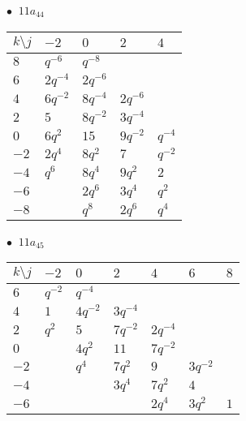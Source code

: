\begin{minipage}{\linewidth}
$\bullet\ $ $11a_{44}$ \vspace{0.5em} \\
\begin{tabular}{l|llll}
$k \setminus j$ & $-2$ & $0$ & $2$ & $4$ \\
\hline
$8$ & $q^{-6}$ & $q^{-8}$ &  &  \\
$6$ & $2q^{-4}$ & $2q^{-6}$ &  &  \\
$4$ & $6q^{-2}$ & $8q^{-4}$ & $2q^{-6}$ &  \\
$2$ & $5$ & $8q^{-2}$ & $3q^{-4}$ &  \\
$0$ & $6q^{2}$ & $15$ & $9q^{-2}$ & $q^{-4}$ \\
$-2$ & $2q^{4}$ & $8q^{2}$ & $7$ & $q^{-2}$ \\
$-4$ & $q^{6}$ & $8q^{4}$ & $9q^{2}$ & $2$ \\
$-6$ &  & $2q^{6}$ & $3q^{4}$ & $q^{2}$ \\
$-8$ &  & $q^{8}$ & $2q^{6}$ & $q^{4}$ \\
\end{tabular}
\vspace{2em}
\end{minipage}
%
\begin{minipage}{\linewidth}
$\bullet\ $ $11a_{45}$ \vspace{0.5em} \\
\begin{tabular}{l|llllll}
$k \setminus j$ & $-2$ & $0$ & $2$ & $4$ & $6$ & $8$ \\
\hline
$6$ & $q^{-2}$ & $q^{-4}$ &  &  &  &  \\
$4$ & $1$ & $4q^{-2}$ & $3q^{-4}$ &  &  &  \\
$2$ & $q^{2}$ & $5$ & $7q^{-2}$ & $2q^{-4}$ &  &  \\
$0$ &  & $4q^{2}$ & $11$ & $7q^{-2}$ &  &  \\
$-2$ &  & $q^{4}$ & $7q^{2}$ & $9$ & $3q^{-2}$ &  \\
$-4$ &  &  & $3q^{4}$ & $7q^{2}$ & $4$ &  \\
$-6$ &  &  &  & $2q^{4}$ & $3q^{2}$ & $1$ \\
\end{tabular}
\vspace{2em}
\end{minipage}
%
